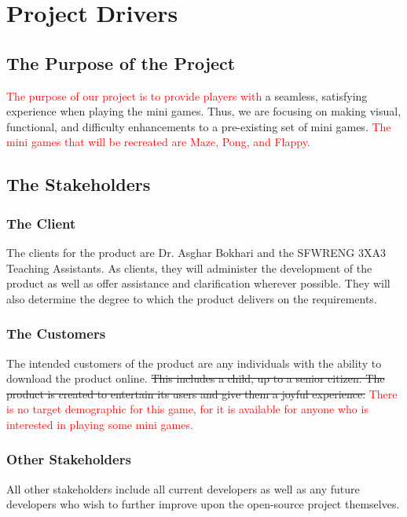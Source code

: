 \documentclass[12pt, titlepage]{article}
\begin{document}
\section{Project Drivers}

\subsection{The Purpose of the Project}

\textcolor{red}{The purpose of our project is to provide players with} a seamless, satisfying experience when playing the mini games. Thus, we are focusing on making visual, functional, and difficulty enhancements to a pre-existing set of mini games. \textcolor{red}{The mini games that will be recreated are Maze, Pong, and Flappy.}

\subsection{The Stakeholders}

\subsubsection{The Client}

The clients for the product are Dr. Asghar Bokhari and the SFWRENG 3XA3 Teaching Assistants. As clients, they will administer the development of the product as well as offer assistance and clarification wherever possible. They will also determine the degree to which the product delivers on the requirements.

\subsubsection{The Customers}

The intended customers of the product are any individuals with the ability to download the product online. \sout{This includes a child, up to a senior citizen. The product is created to entertain its users and give them a joyful experience.} \textcolor{red}{There is no target demographic for this game, for it is available for anyone who is interested in playing some mini games.}

\subsubsection{Other Stakeholders}

All other stakeholders include all current developers as well as any future developers who wish to further improve upon the open-source project themselves.
\end{document}
